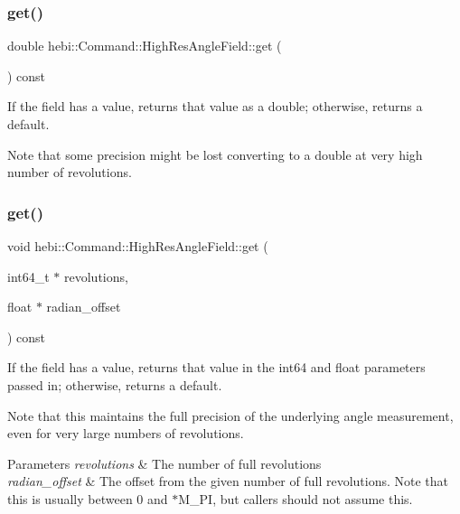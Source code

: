 \subsubsection{\texorpdfstring{get()}{get()}\hspace{0.1cm}{\footnotesize\ttfamily [1/2]}}
{\footnotesize\ttfamily double hebi\+::\+Command\+::\+High\+Res\+Angle\+Field\+::get (\begin{DoxyParamCaption}{ }\end{DoxyParamCaption}) const}



If the field has a value, returns that value as a double; otherwise, returns a default. 

Note that some precision might be lost converting to a double at very high number of revolutions. \mbox{\label{classhebi_1_1Command_1_1HighResAngleField_a4d2e6a23fce48eee2aa28803077cd1f0}} 
\subsubsection{\texorpdfstring{get()}{get()}\hspace{0.1cm}{\footnotesize\ttfamily [2/2]}}
{\footnotesize\ttfamily void hebi\+::\+Command\+::\+High\+Res\+Angle\+Field\+::get (\begin{DoxyParamCaption}\item[{int64\+\_\+t $\ast$}]{revolutions,  }\item[{float $\ast$}]{radian\+\_\+offset }\end{DoxyParamCaption}) const}



If the field has a value, returns that value in the int64 and float parameters passed in; otherwise, returns a default. 

Note that this maintains the full precision of the underlying angle measurement, even for very large numbers of revolutions.


\begin{DoxyParams}{Parameters}
{\em revolutions} & The number of full revolutions\\
\hline
{\em radian\+\_\+offset} & The offset from the given number of full revolutions. Note that this is usually between 0 and {$\ast$\+M\+\_\+\+PI}, but callers should not assume this. \\
\hline
\end{DoxyParams}
\mbox{\label{classhebi_1_1Command_1_1HighResAngleField_a8af360ea241e9c61b77d029242489269}} 
